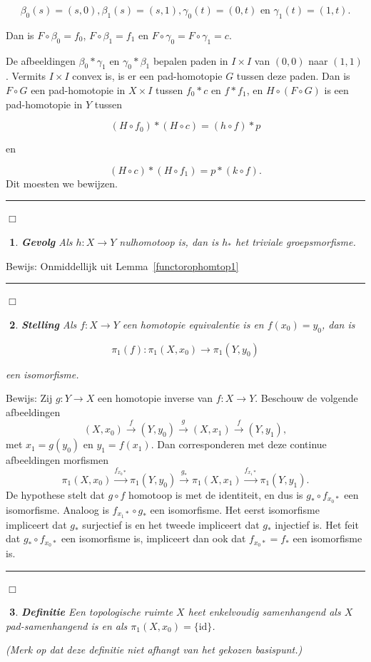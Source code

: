 \documentclass[12pt]{book}
\newcommand{\bew}{{\sc Bewijs: }}
\newcommand{\B}{\rule{1mm}{0mm} \hfill $\Box$ }
\newcommand{\id}{\mbox{id}}
\newtheorem{stelh}{$\!\!$}[section]
\newenvironment{stel}{\begin{stelh}{\em {\bf Stelling }}}{\end{stelh}}
\newtheorem{gevh}[stelh]{$\!\!$}
\newenvironment{gev}{\begin{gevh}{\em {\bf Gevolg }}}{\end{gevh}}
\newtheorem{dfh}[stelh]{$\!\!$}
\newenvironment{df}{\begin{dfh} \em {\bf Definitie }}{\end{dfh}}
\begin{document}
$$\beta_0(s)=(s,0), \beta_1(s)=(s,1), \gamma_0(t)=(0,t) \mbox{ en } \gamma_1(t)=(1,t).$$

Dan is $F\circ \beta_0=f_0$, $F\circ \beta_1=f_1$ en $F\circ \gamma_0=F\circ \gamma_1=c$.   

De afbeeldingen $\beta_0 * \gamma_1$ en $\gamma_0 *\beta_1$ bepalen paden in $I\times I$ van $(0,0)$ naar $(1,1)$. Vermits $I\times I$ convex is, is er een pad-homotopie $G$ tussen deze 
paden. Dan is $F\circ G$ een pad-homotopie in $X \times I$ tussen $f_0*c$ en $f* f_1$, en $H\circ (F\circ G)$ is een pad-homotopie in $Y$ tussen

$$(H\circ f_0)*(H\circ c)=(h\circ f)*p $$

en 

$$(H\circ c)*(H\circ f_1)= p*(k\circ f).$$
Dit moesten we bewijzen. \B

 
\begin{gev}
Als $h:X\to Y$ nulhomotoop is,  dan is $h_{*}$ het triviale groepsmorfisme.
\end{gev}
\bew Onmiddellijk uit Lemma~\ref{functorophomtop1} \B


\begin{stel}\label{functorophomtop}
Als $f:X\to Y$ een homotopie equivalentie is en $f(x_0)=y_0$, dan is

$$\pi_1(f):\pi_1(X,x_0) \to \pi_{1}(Y,y_0)$$

een isomorfisme. 
\end{stel}
\bew Zij $g:Y\to X$ een homotopie inverse van $f:X\to Y$. Beschouw de volgende afbeeldingen
$$(X,x_0) \stackrel{f}{\to} (Y, y_0) \stackrel{g}{\to} (X,x_1)\stackrel{f}{\to}(Y,y_1),$$
met $x_1=g(y_0)$ en $y_1=f(x_1).$ Dan corresponderen met deze continue afbeeldingen morfismen
$$\pi_1(X,x_0) \stackrel{f_{x_{0}*}}{\to} \pi_{1}(Y,y_0) \stackrel{g_{*}}{\to}
\pi_1(X,x_1) \stackrel{f_{x_{1}*}}{\to} \pi_{1}(Y,y_1).$$
De hypothese stelt dat $g\circ f$ homotoop is met de identiteit, en dus is 
$g_* \circ f_{x_{0}*}$ een isomorfisme. Analoog is $f_{x_{1}*}\circ g_*$ een isomorfisme. 
Het eerst isomorfisme impliceert dat $g_*$ surjectief is en het tweede impliceert dat $g_*$ injectief is. Het feit dat $g_* \circ f_{x_{0}*}$ een isomorfisme is, impliceert dan ook dat $f_{x_{0}*}=f_*$ een isomorfisme is.
\B


\begin{df} Een
topologische ruimte $X$ heet {\em enkelvoudig samenhangend} als $X$ pad-samenhangend is en als
$\pi_1(X,x_{0})= \{\id\}$.

(Merk op dat deze definitie niet afhangt van het gekozen basispunt.)
\end{df}
\end{document}
